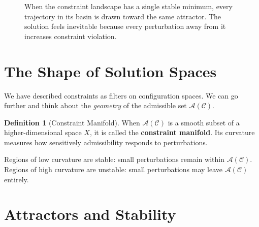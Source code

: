 \documentclass[11pt]{book}
\theoremstyle{plain}
\theoremstyle{definition}
\newtheorem{definition}[theorem]{Definition}
\theoremstyle{remark}
\newcommand{\C}{\mathcal{C}}
\newcommand{\A}{\mathcal{A}}
\begin{document}
\begin{figure}[h]
\centering
{}
\caption{When the constraint landscape has a single stable minimum, every trajectory
in its basin is drawn toward the same attractor. The solution feels inevitable because
every perturbation away from it increases constraint violation.}
\end{figure}

\section{The Shape of Solution Spaces}

We have described constraints as filters on configuration spaces. We can
go further and think about the \emph{geometry} of the admissible set
$\A(\C)$.

\begin{definition}[Constraint Manifold]
When $\A(\C)$ is a smooth subset of a higher-dimensional space $X$, it
is called the \textbf{constraint manifold}. Its curvature measures how
sensitively admissibility responds to perturbations.
\end{definition}

Regions of low curvature are stable: small perturbations remain within
$\A(\C)$. Regions of high curvature are unstable: small perturbations may
leave $\A(\C)$ entirely.

\section{Attractors and Stability}
\end{document}
